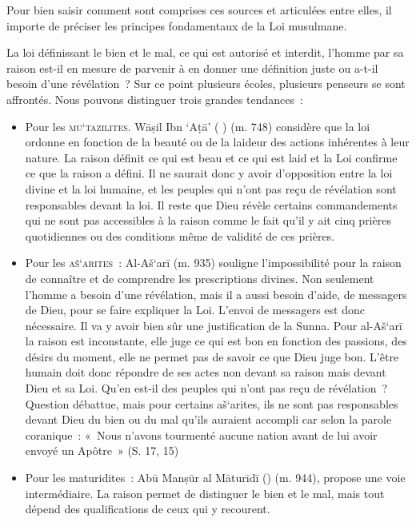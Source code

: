Pour bien saisir comment sont comprises ces sources et articulées entre
elles, il importe de préciser les principes fondamentaux de la Loi
musulmane.


La loi définissant le bien et le mal, ce qui est autorisé et interdit,
l'homme par sa raison est-il en mesure de parvenir à en donner une
définition juste ou a-t-il besoin d'une révélation~? Sur ce point
plusieurs écoles, plusieurs penseurs se sont affrontés. Nous pouvons
distinguer trois grandes tendances~:

\begin{itemize}
\item
  Pour les \textsc{mu`tazilites}. Wāṣil Ibn `Aṭā' ( )
  (m. 748) considère que la loi ordonne en fonction de la beauté ou de
  la laideur des actions inhérentes à leur nature. La raison définit ce
  qui est beau et ce qui est laid et la Loi confirme ce que la raison a
  défini. Il ne saurait donc y avoir d'opposition entre la loi divine et
  la loi humaine, et les peuples qui n'ont pas reçu de révélation sont
  responsables devant la loi. Il reste que Dieu révèle certains
  commandements qui ne sont pas accessibles à la raison comme le fait
  qu'il y ait cinq prières quotidiennes ou des conditions même de
  validité de ces prières.
\item
  Pour les \textsc{aš`arites}~: Al-Aš`arī (m. 935) souligne
  l'impossibilité pour la raison de connaître et de comprendre les
  prescriptions divines. Non seulement l'homme a besoin d'une
  révélation, mais il a aussi besoin d'aide, de messagers de Dieu, pour
  se faire expliquer la Loi. L'envoi de messagers est donc nécessaire.
  Il va y avoir bien sûr une justification de la Sunna. Pour al-Aš`arī
  la raison est inconstante, elle juge ce qui est bon en fonction des
  passions, des désirs du moment, elle ne permet pas de savoir ce que
  Dieu juge bon. L'être humain doit donc répondre de ses actes non
  devant sa raison mais devant Dieu et sa Loi. Qu'en est-il des peuples
  qui n'ont pas reçu de révélation~? Question débattue, mais pour
  certains aš`arites, ils ne sont pas responsables devant Dieu du bien
  ou du mal qu'ils auraient accompli car selon la parole coranique~:
  «~Nous n'avons tourmenté aucune nation avant de lui avoir envoyé un
  Apôtre~» (S. 17, 15)
\item
  Pour les maturidites~: Abū Manṣūr al Māturīdī () (m. 944), propose une voie intermédiaire. La raison permet
  de distinguer le bien et le mal, mais tout dépend des qualifications
  de ceux qui y recourent.
\end{itemize}

